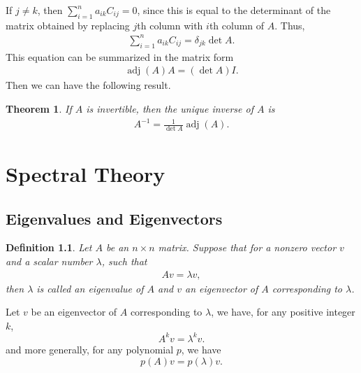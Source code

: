\documentclass[10pt]{book}
\newtheorem{definition}{Definition}[chapter]
\newtheorem{theorem}{Theorem}[chapter]
\theoremstyle{definition}
\numberwithin{equation}{chapter}
\begin{document}
\medskip

If $j \neq k$, then $\sum^n_{i=1} a_{ik} C_{ij} = 0$, since this is equal to the determinant of the matrix obtained by replacing $j$th column with $i$th column of $A$. Thus,
\begin{align*}
    \sum^n_{i=1} a_{ik} C_{ij} = \delta_{jk} \det A.
\end{align*}
This equation can be summarized in the matrix form
\begin{align*}
    \operatorname{adj}(A) A = (\det A) I.
\end{align*}
Then we can have the following result.

\medskip

\begin{theorem}
If $A$ is invertible, then the unique inverse of $A$ is
\begin{align*}
    A^{-1} = \frac{1}{\det A} \operatorname{adj}(A).
\end{align*}
\end{theorem}













\medskip

\chapter{Spectral Theory}

\section{Eigenvalues and Eigenvectors}

\begin{definition}
Let $A$ be an $n\times n$ matrix. Suppose that for a nonzero vector $v$ and a scalar number $\lambda$, such that 
\begin{align*}
    Av = \lambda v,
\end{align*}
then $\lambda$ is called an eigenvalue of $A$ and $v$ an eigenvector of $A$ corresponding to $\lambda$.
\end{definition}

Let $v$ be an eigenvector of $A$ corresponding to $\lambda$, we have, for any positive integer $k$, 
$$A^k v = \lambda^k v.$$
and more generally, for any polynomial $p$, we have 
$$p(A)v = p(\lambda)v.$$
\end{document}
